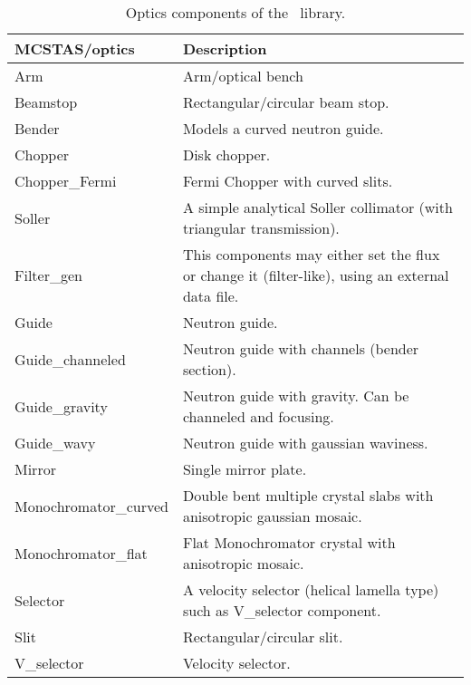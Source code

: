 \begin{table}
  \begin{center}
    {\let\my=\\
    \begin{tabular}{|p{}|p{}|}
      \hline
       MCSTAS/optics & Description \\
       \hline
Arm                &  Arm/optical bench \\
 Beamstop          &   Rectangular/circular
                      beam stop. \\
 Bender            &   Models a curved
                      neutron guide. \\
 Chopper           &   Disk chopper. \\
 Chopper\_Fermi     &   Fermi Chopper with
                      curved slits. \\
 Soller            &  A simple analytical Soller collimator
                      (with triangular
                      transmission).  \\
 Filter\_gen        &   This components may
                      either set the flux
                      or change it (filter-like), using
                      an external data
                      file. \\
 Guide             &   Neutron guide. \\
 Guide\_channeled   &   Neutron guide with
                      channels (bender
                      section). \\
 Guide\_gravity     &  Neutron guide with gravity. Can be
                      channeled and focusing. \\

 Guide\_wavy        &   Neutron guide with
                      gaussian waviness. \\

 Mirror             &  Single mirror plate. \\

                      
 Monochromator\_curved & Double bent multiple crystal
                      slabs with anisotropic gaussian
                      mosaic. \\

 Monochromator\_flat &  Flat Monochromator
                      crystal with
                      anisotropic mosaic. \\

 Selector            & A velocity selector
                      (helical lamella
                      type) such as
                      V\_selector component. \\

 Slit                & Rectangular/circular
                      slit. \\

 V\_selector          & Velocity selector. \\
      \hline
    \end{tabular}
    \caption{Optics components of the \MCS\ library.}
    \label{t:comp-optics}
    }
  \end{center}
\end{table}

